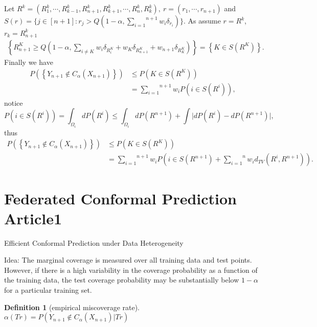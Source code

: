 \documentclass[12pt, a4paper, oneside]{article}
\newtheorem{definition}[theorem]{Definition}
\begin{document}
    Let $R^k=(R_1^k,\cdots,R_{k-1}^k,R_{n+1}^k,R_{k+1}^k,\cdots,R_n^k,R_k^k),\ r=(r_1,\cdots,r_{n+1})$ and $S(r)=\{j\in[n+1]:r_j>Q(1-\alpha,\overset{n+1}{\underset{i=1}\sum}w_i\delta_{r_i})\}$. As assume $r=R^k$, $r_k=R_{n+1}^k$
    \begin{align*}
        \left\{ R_{n+1}^K\geq Q(1-\alpha,\overset{}{\underset{i\neq K}\sum}w_i\delta_{R_i^K}+w_K\delta_{R_{n+1}^K}+w_{n+1}\delta_{R_K^K}) \right\}=\left\{ K\in S(R^K) \right\}.
    \end{align*}
    Finally we have
    \begin{align*}
        P(\left\{ Y_{n+1}\notin C_\alpha(X_{n+1}) \right\})&\leq P(K\in S(R^K))\\
        &=\overset{n+1}{\underset{i=1}\sum}w_iP(i\in S(R^i)),
    \end{align*}
    notice 
    \begin{equation*}
        P(i\in S(R^i))=\int_{\Omega_i}dP(R^i)\leq \int_{\Omega_i}dP(R^{n+1})+\int\Big|dP(R^i)-dP(R^{n+1})\Big|,
    \end{equation*}
    thus
    \begin{align*}
        P(\left\{ Y_{n+1}\notin C_\alpha(X_{n+1}) \right\})&\leq P(K\in S(R^K))\\
        &=\overset{n+1}{\underset{i=1}\sum}w_iP(i\in S(R^{n+1})+\overset{n}{\underset{i=1}\sum}w_id_{TV}(R^i,R^{n+1})).
    \end{align*}


\section{Federated Conformal Prediction Article1}
    Efficient Conformal Prediction under Data Heterogeneity\cite{plassier2024efficient}


    Idea: The marginal coverage is measured over all training data and test points. However, if there is a high variability in the coverage probability as a function of the training data, the test coverage probability may be substantially below $1-\alpha$ for a particular training set.
    \begin{definition}[empirical miscoverage rate]
        $\alpha(Tr)=P(Y_{n+1}\notin C_\alpha(X_{n+1})|Tr)$
    \end{definition}
\end{document}
